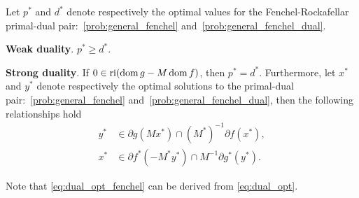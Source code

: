 \begin{theorem} 
    Let $p^*$ and $d^*$ denote respectively the optimal values for the Fenchel-Rockafellar primal-dual pair:~\eqref{prob:general_fenchel} and~\eqref{prob:general_fenchel_dual}. 
    \item \textbf{Weak duality}. $p^* \geq d^*$. 
    \item \textbf{Strong duality}. 
    If $0\in\operatorname{ri}(\operatorname{dom} g - M\operatorname{dom} f)$, then $p^* = d^*$. Furthermore, let $x^*$ and $y^*$ denote respectively the optimal solutions to the primal-dual pair:~\eqref{prob:general_fenchel} and~\eqref{prob:general_fenchel_dual}, then the following relationships hold
    \begin{equation} \label{eq:dual_opt_fenchel}
        \begin{split}
            y^* &\in \partial g(Mx^*) \cap (M^*)^{-1}\partial f(x^*),
        \\x^* &\in \partial f^*(-M^*y^*)\cap M^{-1}\partial g^*(y^*).
        \end{split}
    \end{equation}
\end{theorem}
Note that \eqref{eq:dual_opt_fenchel} can be derived from \eqref{eq:dual_opt}. 




